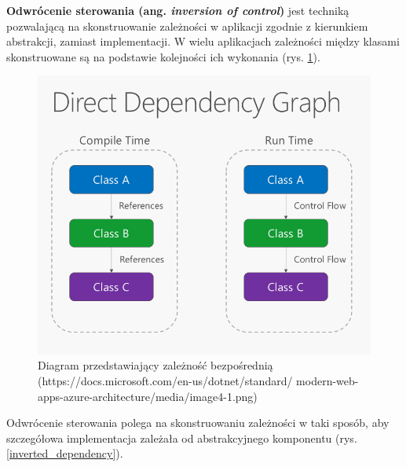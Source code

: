 \textbf{Odwrócenie sterowania (ang. \textit{inversion of control})} jest techniką pozwalającą na skonstruowanie zależności w aplikacji zgodnie z kierunkiem abstrakcji, zamiast implementacji. W wielu aplikacjach zależności między klasami skonstruowane są na podstawie kolejności ich wykonania (rys. \ref{direct_dependency}).
\begin{figure}[!ht]
	\begin{center}
		\includegraphics[width=6in]{img/diagram/direct_dependency.png}
		\caption{Diagram przedstawiający zależność bezpośrednią (https://docs.microsoft.com/en-us/dotnet/standard/ modern-web-apps-azure-architecture/media/image4-1.png)}
		\label{direct_dependency}
	\end{center}
\end{figure}
Odwrócenie sterowania polega na skonstruowaniu zależności w taki sposób, aby szczegółowa implementacja zależała od abstrakcyjnego komponentu (rys. \ref{inverted_dependency}).\cite{inversionofcontrol}

